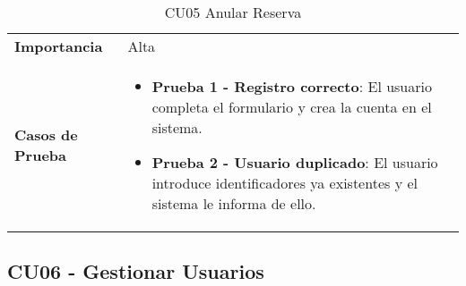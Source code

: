 \begin{table}[H]
\begin{tabularx}{\linewidth}{ p{} p{} }
		\textbf{Importancia}          & Alta \\
		\textbf{Casos de Prueba}      &
		\begin{itemize}
			\item \textbf{Prueba 1 - Registro correcto}: El usuario completa el formulario y crea la cuenta en el sistema.
			\item \textbf{Prueba 2 - Usuario duplicado}: El usuario introduce identificadores ya existentes y el sistema le informa de ello.
		\end{itemize} \\
		\bottomrule
	\end{tabularx}
	\caption{CU05 Anular Reserva}
	\label{cu:anular-reserva}
\end{table}

\subsection{CU06 - Gestionar Usuarios}

